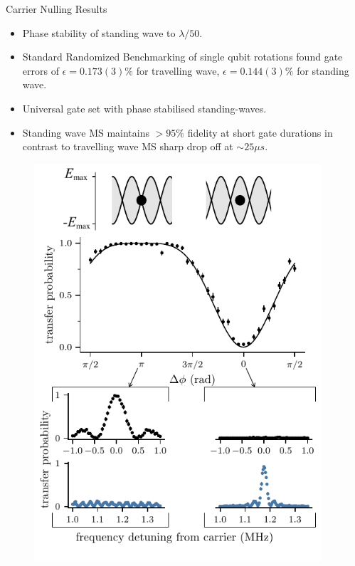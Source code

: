 \documentclass[final]{beamer}
\begin{document}
\begin{frame}{}
\begin{center}
\begin{columns}[t]
\begin{column}{0.49\textwidth}
  \end{column}
  \begin{column}{0.49\textwidth}
    \begin{alertblock}{Carrier Nulling Results}
      \begin{minipage}{0.6\linewidth}
      \begin{itemize}
        \item Phase stability of standing wave to $\lambda/50$.
        \item Standard Randomized Benchmarking of single qubit
          rotations found gate errors of $\epsilon = 0.173(3)\%$ for
          travelling wave, $\epsilon = 0.144(3)\%$ for standing
          wave.
        \item Universal gate set with phase stabilised standing-waves.
        \item Standing wave MS maintains $>95\%$ fidelity at short gate durations in contrast to travelling wave MS sharp drop off at $\sim 25\mu s$.
      \end{itemize}
      \end{minipage}
      \begin{minipage}{0.34\linewidth}
      \begin{figure}
        \includegraphics[width=\textwidth]{./figs/Figure_2_v2.pdf}

\end{figure}
\end{minipage}
\end{alertblock}
\end{column}
\end{columns}
\end{center}
\end{frame}
\end{document}

